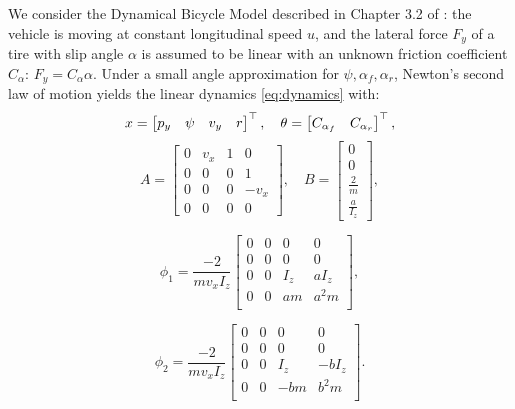 \documentclass[letterpaper, 10 pt, conference]{ieeeconf}  %
\begin{document}
We consider the Dynamical Bicycle Model described in Chapter 3.2 of \cite{awan2014compensation}: the vehicle is moving at constant longitudinal speed $u$, and the lateral force $F_y$ of a tire with slip angle $\alpha$ is assumed to be linear with an unknown friction coefficient $C_\alpha$: $F_y = C_\alpha \alpha$.
Under a small angle approximation for $\psi, \alpha_f, \alpha_r$, Newton's second law of motion yields the linear dynamics \eqref{eq:dynamics} with:
\begin{align*}
x = \begin{bmatrix} {p_y} & {\psi} & {v_y} & {r} \end{bmatrix}^\top,\quad
\theta = \begin{bmatrix} C_{\alpha_f} & C_{\alpha_r}\end{bmatrix}^\top,
\end{align*}
\[
A = \begin{bmatrix}
0 & v_x & 1 & 0 \\
0 & 0 & 0 & 1 \\
0 & 0 & 0 & - v_x \\
0 & 0 & 0 & 0
\end{bmatrix},\quad
B =
\begin{bmatrix}
0 \\
0 \\
\frac{2}{m} \\
\frac{a}{I_z}
\end{bmatrix},
\]

\[
\phi_1 = \frac{-2}{m v_x I_z}\begin{bmatrix}
0 & 0 & 0 & 0 \\
0 & 0 & 0 & 0 \\
0 & 0 & I_z & a I_z \\
0 & 0 & a m & a^2 m \\
\end{bmatrix},
\]

\[
\phi_2 = \frac{-2}{m v_x I_z}\begin{bmatrix}
0 & 0 & 0 & 0 \\
0 & 0 & 0 & 0 \\
0 & 0 & I_z & -b I_z \\
0 & 0 & - bm & b^2 m \\
\end{bmatrix}.
\]
\end{document}
